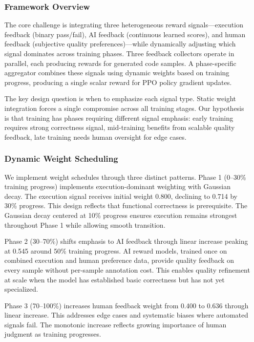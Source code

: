 
\subsubsection{Framework Overview}

The core challenge is integrating three heterogeneous reward signals---execution feedback (binary pass/fail), AI feedback (continuous learned scores), and human feedback (subjective quality preferences)---while dynamically adjusting which signal dominates across training phases. Three feedback collectors operate in parallel, each producing rewards for generated code samples. A phase-specific aggregator combines these signals using dynamic weights based on training progress, producing a single scalar reward for PPO policy gradient updates.

The key design question is when to emphasize each signal type. Static weight integration forces a single compromise across all training stages. Our hypothesis is that training has phases requiring different signal emphasis: early training requires strong correctness signal, mid-training benefits from scalable quality feedback, late training needs human oversight for edge cases.

\subsubsection{Dynamic Weight Scheduling}

We implement weight schedules through three distinct patterns. Phase 1 (0--30\% training progress) implements execution-dominant weighting with Gaussian decay. The execution signal receives initial weight 0.800, declining to 0.714 by 30\% progress. This design reflects that functional correctness is prerequisite. The Gaussian decay centered at 10\% progress ensures execution remains strongest throughout Phase 1 while allowing smooth transition.

Phase 2 (30--70\%) shifts emphasis to AI feedback through linear increase peaking at 0.545 around 50\% training progress. AI reward models, trained once on combined execution and human preference data, provide quality feedback on every sample without per-sample annotation cost. This enables quality refinement at scale when the model has established basic correctness but has not yet specialized.

Phase 3 (70--100\%) increases human feedback weight from 0.400 to 0.636 through linear increase. This addresses edge cases and systematic biases where automated signals fail. The monotonic increase reflects growing importance of human judgment as training progresses.

